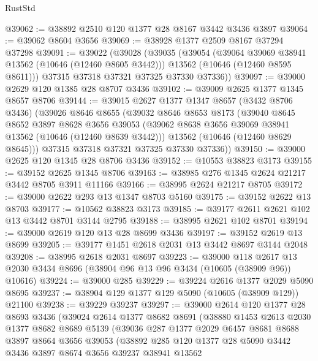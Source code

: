 \begin{lexlean}{RustStd}
\begin{coremodule}
@39062 := @38892 @2510 @120 @1377 @28 @8167 @3442 @3436 @3897
@39064 := @39062 @8604 @3656
@39069 := @38928 @1377 @2509 @8167 @37294 @37298
@39091 := @39022
    (@39028
      (@39035
        (@39054
          (@39064 @39069 @38941 @13562 (@10646 (@12460 @8605 @3442)))
          @13562
          (@10646 (@12460 @8595 @8611)))
        @37315
        @37318
        @37321
        @37325
        @37330
        @37336))
@39097 := @39000 @2629 @120 @1385 @28 @8707 @3436
@39102 := @39009 @2625 @1377 @1345 @8657 @8706
@39144 := @39015
    @2627
    @1377
    @1347
    @8657
    (@3432 @8706 @3436)
    (@39026
      @8646
      @8655
      (@39032
        @8646
        @8653
        @8173
        (@39040
          @8645
          @8652
          @3897
          @8628
          @3656
          @39053
          (@39062 @8638 @3656 @39069 @38941 @13562 (@10646 (@12460 @8639 @3442)))
          @13562
          (@10646 (@12460 @8629 @8645)))
        @37315
        @37318
        @37321
        @37325
        @37330
        @37336))
@39150 := @39000 @2625 @120 @1345 @28 @8706 @3436
@39152 := @10553 @38823 @3173
@39155 := @39152 @2625 @1345 @8706
@39163 := @38985 @276 @1345 @2624 @21217 @3442 @8705 @3911 @11166
@39166 := @38995 @2624 @21217 @8705
@39172 := @39000 @2622 @293 @13 @1347 @8703 @5160
@39175 := @39152 @2622 @13 @8703
@39177 := @10562 @38823 @3173
@39185 := @39177 @2611 @2621 @102 @13 @3442 @8701 @3144 @2795
@39188 := @38995 @2621 @102 @8701
@39194 := @39000 @2619 @120 @13 @28 @8699 @3436
@39197 := @39152 @2619 @13 @8699
@39205 := @39177 @1451 @2618 @2031 @13 @3442 @8697 @3144 @2048
@39208 := @38995 @2618 @2031 @8697
@39223 := @39000
    @118
    @2617
    @13
    @2030
    @3434
    @8696
    (@38904 @96 @13 @96 @3434 (@10605 (@38909 @96)) @10616)
@39224 := @39000 @285
@39229 := @39224 @2616 @1377 @2029 @5090 @8695
@39237 := @38904 @129 @1377 @129 @5090 (@10605 (@38909 @129)) @21100
@39238 := @39229 @39237
@39297 := @39000
    @2614
    @120
    @1377
    @28
    @8693
    @3436
    (@39024
      @2614
      @1377
      @8682
      @8691
      (@38880
        @1453
        @2613
        @2030
        @1377
        @8682
        @8689
        @5139
        (@39036
          @287
          @1377
          @2029
          @6457
          @8681
          @8688
          @3897
          @8664
          @3656
          @39053
          (@38892
            @285
            @120
            @1377
            @28
            @5090
            @3442
            @3436
            @3897
            @8674
            @3656
            @39237
            @38941
            @13562

\end{coremodule}
\end{lexlean}
